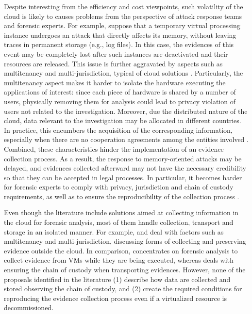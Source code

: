 \documentclass[twocolumn, notitlepage]{bmcart}%
\begin{document}
%
Despite interesting from the efficiency and cost viewpoints, such volatility of the cloud is likely to causes problems from the perspective of attack response teams and forensic experts.
%
For example, suppose that a temporary virtual processing instance undergoes an attack that directly affects its memory, without leaving traces in permanent storage (e.g., log files).
%
In this case, the evidences of this event may be completely lost after such instances are deactivated and their resources are released.
%
This issue is further aggravated by aspects such as multitenancy and multi-jurisdiction, typical of cloud solutions \cite{Bash_Adv_in_Forensics:2015}.
%
Particularly, the multitenancy aspect makes it harder to isolate the hardware executing the applications of interest: since each piece of hardware is shared by a number of users, physically removing them for analysis could lead to privacy violation of users not related to the investigation. 
%
Moreover, due the distributed nature of the cloud, data relevant to the investigation may be allocated in different countries.
%
In practice, this encumbers the acquisition of the corresponding information, especially when there are no cooperation agreements among the entities involved \cite{Dykstra_Acquiring_for_IAAS:2012}.
%
Combined, these characteristics hinder the implementation of an evidence collection process.
%
As a result, the response to memory-oriented attacks may be delayed, and evidences collected afterward may not have the necessary credibility so that they can be accepted in legal processes.
%
In particular, it becomes harder for forensic experts to comply with privacy, jurisdiction and chain of custody requirements, as well as to ensure the reproducibility of the collection process \cite{Rahman_Live_Forensics_Techniques:2015}.


%
Even though the literature include solutions aimed at collecting information in the cloud for forensic analysis, most of them handle collection, transport and storage in an isolated manner.
%
For example, \cite{Dykstra_FROST:2013} and \cite{Reichert_Auto_acquisition:2015} deal with factors such as multitenancy and multi-jurisdiction, discussing forms of collecting and preserving evidence outside the cloud.
%
In comparison, \cite{George_DF2CE:2012} concentrates on forensic analysis to collect evidence from VMs while they are being executed, whereas \cite{Sang_Log_approach:2013} deals with ensuring the chain of custody when transporting evidences.
%
However, none of the proposals identified in the literature (1) describe how data are collected and stored observing the chain of custody, and (2) create the required conditions for reproducing the evidence collection process even if a virtualized resource is decommissioned.
\end{document}
